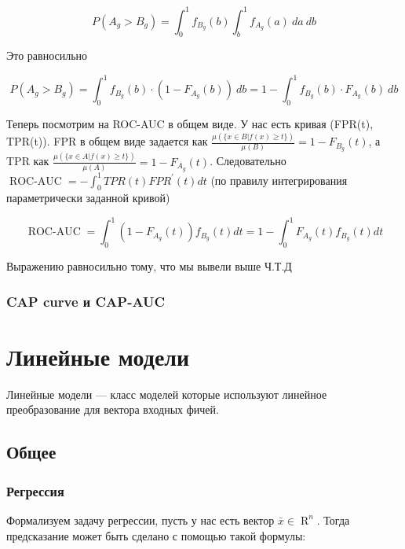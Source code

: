 \documentclass{article}
\begin{document}
    \begin{equation}
        P(A_{g} > B_{g}) = \int_{0}^{1} f_{B_{g}}(b) \int_{b}^{1} f_{A_{g}}(a) \ da \ db
    \end{equation}

    Это равносильно 

    \begin{equation}
        P(A_{g} > B_{g}) = \int_{0}^{1} f_{B_{g}}(b) \cdot (1 - F_{A_{g}}(b)) \ db = 1 - \int_{0}^{1} f_{B_{g}}(b) \cdot F_{A_{g}}(b) \ db
    \end{equation}

    Теперь посмотрим на ROC-AUC в общем виде. 
    У нас есть кривая (FPR(t), TPR(t)). 
    FPR в общем виде задается как $\frac{\mu(\{x \in B | f(x) \geq t\})}{\mu(B)} = 1 - F_{B_{g}}(t)$, 
    а TPR как $\frac{\mu(\{x \in A | f(x) \geq t\})}{\mu(A)} = 1 - F_{A_{g}}(t)$. Следовательно 
    $\operatorname{ROC-AUC} = - \int_{0}^{1} TPR(t) FPR^{'}(t) dt$ 
    (по правилу интегрирования параметрически заданной кривой)

    \begin{equation}
       \operatorname{ROC-AUC} = \int_{0}^{1} (1 - F_{A_{g}}(t)) f_{B_{g}}(t) dt = 1 - \int_{0}^{1} F_{A_{g}}(t) f_{B_{g}}(t) dt
    \end{equation}

    Выражению равносильно тому, что мы вывели выше Ч.Т.Д 


    \subsubsection{CAP curve и CAP-AUC}

    \section{Линейные модели}

    Линейные модели --- класс моделей которые используют линейное преобразование для вектора входных фичей.

    \subsection{Общее}

    \subsubsection{Регрессия}

    Формализуем задачу регрессии, пусть у нас есть вектор $\bar{x} \in \operatorname{R}^{n}$.
    Тогда предсказание может быть сделано с помощью такой формулы:
\end{document}
